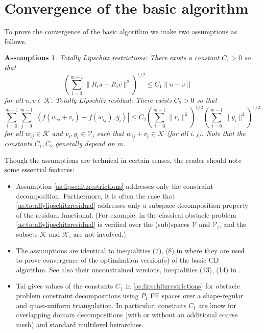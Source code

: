 \documentclass[letterpaper,final,12pt,reqno]{amsart}
\theoremstyle{cstyle}
\theoremstyle{cstyle*}
\newtheorem{assumptions*}{Assumptions}
\theoremstyle{dstyle}
\numberwithin{equation}{section}
\numberwithin{figure}{section}
\numberwithin{table}{section}
\numberwithin{theorem}{section}
\newcommand{\cK}{\mathcal{K}}
\newcommand{\cV}{\mathcal{V}}
\newcommand{\ip}[2]{\left<#1,#2\right>}
\begin{document}
\section{Convergence of the basic algorithm} \label{sec:convergence}

To prove the convergence of the basic algorithm we make two assumptions as follows.

\begin{assumptions*}  \emph{Totally Lipschitz restrictions}: There exists a constant $C_1>0$ so that
\begin{equation}
\left(\sum_{i=0}^{m-1} \|R_i u - R_i v\|^2\right)^{1/2} \le C_1 \|u-v\| \label{as:lipschitzrestrictions}
\end{equation}
for all $u,v\in\cK$.  \emph{Totally Lipschitz residual}: There exists $C_2>0$ so that
\begin{equation}
\sum_{i=0}^{m-1} \sum_{j=0}^{m-1} \left|\ip{f(w_{ij} + v_i) - f(w_{ij})}{y_i}\right| \le C_2 \left(\sum_{i=0}^{m-1} \|v_i\|^2\right)^{1/2} \left(\sum_{i=0}^{m-1} \|y_i\|^2\right)^{1/2} \label{as:lipschitzresidual}
\end{equation}
for all $w_{ij} \in \cK$ and $v_i,y_i \in \cV_i$ such that $w_{ij} + v_i \in \cK$ (for all $i,j$).  Note that the constants $C_1,C_2$ generally depend on $m$.
\end{assumptions*}

Though the assumptions are technical in certain senses, the reader should note some essential features:
\begin{itemize}
\item Assumption \eqref{as:lipschitzrestrictions} addresses only the constraint decomposition.  Furthermore, it is often the case that \eqref{as:totallylipschitzresidual} addresses only a subspace decomposition property of the residual functional.  (For example, in the classical obstacle problem \eqref{as:totallylipschitzresidual} is verified over the (sub)spaces $\cV$ and $\cV_i$, and the subsets $\cK$ and $\cK_i$ are not involved.)
\item The assumptions are identical to inequalities (7), (8) in \cite{Tai2003} where they are used to prove convergence of the optimization version(s) of the basic CD algorithm.  See also their unconstrained versions, inequalities (13), (14) in \cite{TaiXu2002}.
\item Tai \cite{Tai2003} gives values of the constants $C_1$ in \eqref{as:lipschitzrestrictions} for obstacle problem constraint decompositions using $P_1$ FE spaces over a shape-regular and quasi-uniform triangulation.  In particular, constants $C_1$ are know for overlapping domain decompositions (with or without an additional coarse mesh) and standard multilevel heirarchies.
\end{itemize}
\end{document}
